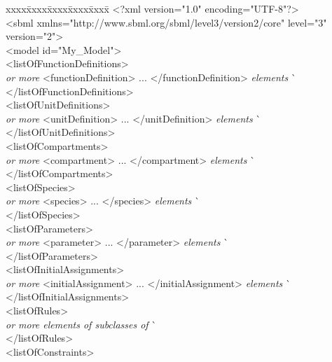 \vspace*{2ex}
\begin{tt}
  \tightspacing
  \small
  \begin{tabbing}
xxxx\=xxxx\=xxxx\=xxxx\=xxxx\=\kill
\+\>
<?xml version="1.0" encoding="UTF-8"?>\\
<sbml xmlns="http://www.sbml.org/sbml/level3/version2/core" level="3" version="2">\\
\><model id="My\_Model">\\
\>\><listOfFunctionDefinitions>\\
\>\>\>\textrm{\emph{ or more}} <functionDefinition> ... </functionDefinition> \textrm{\emph{elements}}  \` \sayOptional\\
\>\></listOfFunctionDefinitions>\\
\>\><listOfUnitDefinitions>\\
\>\>\>\textrm{\emph{ or more}} <unitDefinition> ... </unitDefinition> \textrm{\emph{elements}}  \` \sayOptional\\
\>\></listOfUnitDefinitions>\\
\>\><listOfCompartments>\\
\>\>\>\textrm{\emph{ or more}} <compartment> ... </compartment> \textrm{\emph{elements}}  \` \sayOptional\\
\>\></listOfCompartments>\\
\>\><listOfSpecies>\\
\>\>\>\textrm{\emph{ or more}} <species> ... </species> \textrm{\emph{elements}}  \` \sayOptional\\
\>\></listOfSpecies>\\
\>\><listOfParameters>\\
\>\>\>\textrm{\emph{ or more}} <parameter> ... </parameter> \textrm{\emph{elements}}  \` \sayOptional\\
\>\></listOfParameters>\\
\>\><listOfInitialAssignments>\\
\>\>\>\textrm{\emph{ or more}} <initialAssignment> ... </initialAssignment> \textrm{\emph{elements}}  \` \sayOptional\\
\>\></listOfInitialAssignments>\\
\>\><listOfRules>\\
\>\>\>\textrm{\emph{ or more elements of subclasses of }}  \` \sayOptional\\
\>\></listOfRules>\\
\>\><listOfConstraints>\\

\end{tabbing}
\end{tt}
